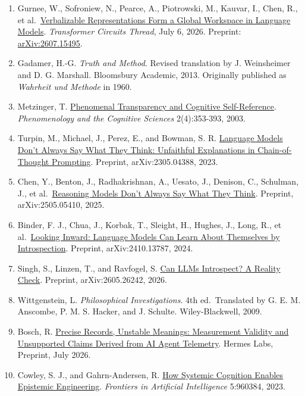 \documentclass[12pt]{article}
\providecommand{\tightlist}{%
  \setlength{\itemsep}{0pt}\setlength{\parskip}{0pt}}
\begin{document}
\begin{enumerate}
\def\labelenumi{\arabic{enumi}.}
\tightlist
\item
  Gurnee, W., Sofroniew, N., Pearce, A., Piotrowski, M., Kauvar, I., Chen, R., et al.~\href{https://transformer-circuits.pub/2026/workspace/}{Verbalizable Representations Form a Global Workspace in Language Models}. \emph{Transformer Circuits Thread}, July 6, 2026. Preprint: \href{https://doi.org/10.48550/arXiv.2607.15495}{arXiv:2607.15495}.
\item
  Gadamer, H.-G. \emph{Truth and Method}. Revised translation by J. Weinsheimer and D. G. Marshall. Bloomsbury Academic, 2013. Originally published as \emph{Wahrheit und Methode} in 1960.
\item
  Metzinger, T. \href{https://doi.org/10.1023/B:PHEN.0000007366.42918.eb}{Phenomenal Transparency and Cognitive Self-Reference}. \emph{Phenomenology and the Cognitive Sciences} 2(4):353-393, 2003.
\item
  Turpin, M., Michael, J., Perez, E., and Bowman, S. R. \href{https://doi.org/10.48550/arXiv.2305.04388}{Language Models Don't Always Say What They Think: Unfaithful Explanations in Chain-of-Thought Prompting}. Preprint, arXiv:2305.04388, 2023.
\item
  Chen, Y., Benton, J., Radhakrishnan, A., Uesato, J., Denison, C., Schulman, J., et al.~\href{https://doi.org/10.48550/arXiv.2505.05410}{Reasoning Models Don't Always Say What They Think}. Preprint, arXiv:2505.05410, 2025.
\item
  Binder, F. J., Chua, J., Korbak, T., Sleight, H., Hughes, J., Long, R., et al.~\href{https://doi.org/10.48550/arXiv.2410.13787}{Looking Inward: Language Models Can Learn About Themselves by Introspection}. Preprint, arXiv:2410.13787, 2024.
\item
  Singh, S., Linzen, T., and Ravfogel, S. \href{https://doi.org/10.48550/arXiv.2605.26242}{Can LLMs Introspect? A Reality Check}. Preprint, arXiv:2605.26242, 2026.
\item
  Wittgenstein, L. \emph{Philosophical Investigations}. 4th ed.~Translated by G. E. M. Anscombe, P. M. S. Hacker, and J. Schulte. Wiley-Blackwell, 2009.
\item
  Bosch, R. \href{https://doi.org/10.5281/zenodo.21652317}{Precise Records, Unstable Meanings: Measurement Validity and Unsupported Claims Derived from AI Agent Telemetry}. Hermes Labs, Preprint, July 2026.
\item
  Cowley, S. J., and Gahrn-Andersen, R. \href{https://doi.org/10.3389/frai.2022.960384}{How Systemic Cognition Enables Epistemic Engineering}. \emph{Frontiers in Artificial Intelligence} 5:960384, 2023.

\end{enumerate}
\end{document}
